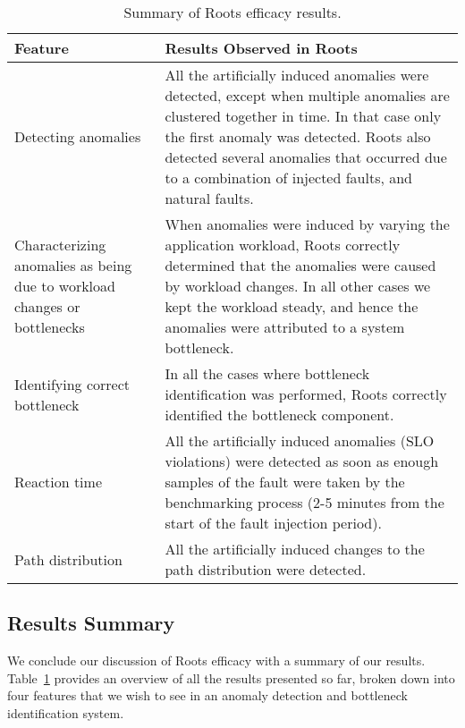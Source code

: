 \begin{table}
\begin{center}
\begin{tabular}{|p{2cm}|p{6cm}|}
\hline
Feature & Results Observed in Roots \\ \hline
Detecting anomalies & 
All the artificially induced anomalies were detected, except when multiple anomalies are
clustered together in time. In that case only the first anomaly was detected.
Roots also detected several anomalies that occurred
due to a combination of injected faults, and natural faults. \\ \hline
Characterizing anomalies as
being due to workload changes or bottlenecks &
When anomalies were induced by varying the application workload, Roots correctly determined
that the anomalies were caused by workload changes. In all other cases
we kept the workload steady, and hence the anomalies were attributed to a
system bottleneck. \\ \hline
Identifying correct bottleneck & 
In all the cases where bottleneck identification was performed, Roots correctly identified 
the bottleneck component. \\ \hline
Reaction time & 
All the artificially induced anomalies (SLO violations) were detected as soon as enough samples of the fault
were taken by the benchmarking process (2-5 minutes from the start of the fault injection period). \\ \hline
Path distribution &
All the artificially induced changes to the path distribution were detected. \\
\hline
\end{tabular}
\end{center}
\caption{Summary of Roots efficacy results.
\label{tab:results_summary}
}
\end{table}

\subsection{Results Summary}
We conclude our discussion of Roots efficacy with a summary of our results. Table~\ref{tab:results_summary}
provides an overview of all the results presented so far, broken down into four features that we wish to see
in an anomaly detection and bottleneck identification system.

